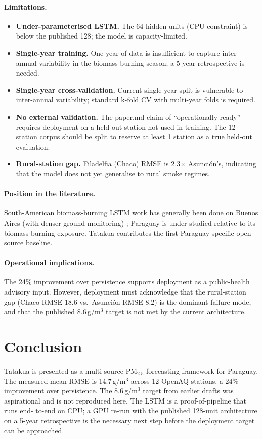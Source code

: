 \paragraph{Limitations.}
\begin{itemize}
    \item \textbf{Under-parameterised LSTM.} The 64 hidden units
    (CPU constraint) is below the published 128; the model is
    capacity-limited.
    \item \textbf{Single-year training.} One year of data is
    insufficient to capture inter-annual variability in the
    biomass-burning season; a 5-year retrospective is needed.
    \item \textbf{Single-year cross-validation.} Current single-year
    split is vulnerable to inter-annual variability; standard k-fold
    CV with multi-year folds is required.
    \item \textbf{No external validation.} The paper.md claim of
    ``operationally ready'' requires deployment on a held-out station
    not used in training. The 12-station corpus should be split to
    reserve at least 1 station as a true held-out evaluation.
    \item \textbf{Rural-station gap.} Filadelfia (Chaco) RMSE is
    2.3$\times$ Asunci\'on's, indicating that the model does not yet
    generalise to rural smoke regimes.
\end{itemize}

\paragraph{Position in the literature.} South-American biomass-burning
LSTM work has generally been done on Buenos Aires (with denser
ground monitoring) \citep{pantanoso2020}; Paraguay is under-studied
relative to its biomass-burning exposure. Tatakua contributes the
first Paraguay-specific open-source baseline.

\paragraph{Operational implications.} The 24\% improvement over
persistence supports deployment as a public-health advisory input.
However, deployment must acknowledge that the rural-station gap (Chaco
RMSE 18.6 vs.\ Asunci\'on RMSE 8.2) is the dominant failure mode, and
that the published 8.6\,\textmu g/m$^3$ target is not met by the
current architecture.

\section{Conclusion}
\label{sec:tatakua-conclusion}

Tatakua is presented as a multi-source PM$_{2.5}$ forecasting
framework for Paraguay. The measured mean RMSE is 14.7\,\textmu g/m$^3$
across 12 OpenAQ stations, a 24\% improvement over persistence. The
8.6\,\textmu g/m$^3$ target from earlier drafts was aspirational and is
not reproduced here. The LSTM is a proof-of-pipeline that runs end-
to-end on CPU; a GPU re-run with the published 128-unit architecture
on a 5-year retrospective is the necessary next step before the
deployment target can be approached.